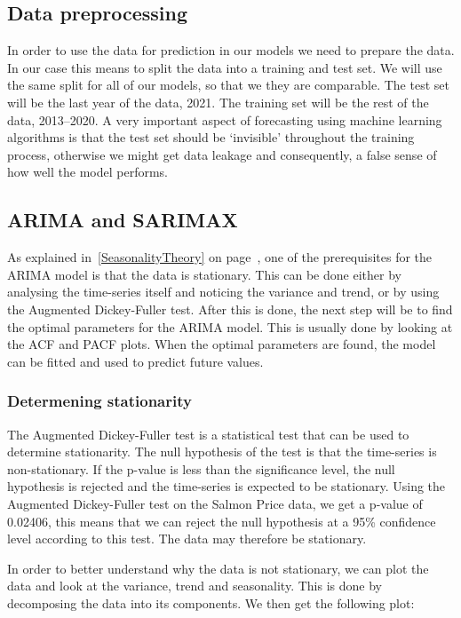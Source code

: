 \subsection{Data preprocessing}
In order to use the data for prediction in our models we need to prepare the data. In our case this means to split the data into a training and test set. We will use the same split for all of our models, so that we they are comparable. The test set will be the last year of the data, 2021. The training set will be the rest of the data, 2013--2020. A very important aspect of forecasting using machine learning algorithms is that the test set should be `invisible' throughout the training process, otherwise we might get data leakage and consequently, a false sense of how well the model performs.~\parencite{brownlee_2016}
\subsection{ARIMA and SARIMAX}\label{ARIMA and SARIMAX Methodology}

As explained in~\ref{SeasonalityTheory} on page~\pageref{SeasonalityTheory}, one of the prerequisites for the ARIMA model is that the data is stationary. This can be done either by analysing the time-series itself and noticing the variance and trend, or by using the Augmented Dickey-Fuller test. 
After this is done, the next step will be to find the optimal parameters for the ARIMA model. This is usually done by looking at the ACF and PACF plots. 
When the optimal parameters are found, the model can be fitted and used to predict future values. \parencite{hyndman_athanasopoulos_2021}

\subsubsection{Determening stationarity}\label{DeterminingStationarity}
The Augmented Dickey-Fuller test is a statistical test that can be used to determine stationarity. The null hypothesis of the test is that the time-series is non-stationary. If the p-value is less than the significance level, the null hypothesis is rejected and the time-series is expected to be stationary.
Using the Augmented Dickey-Fuller test on the Salmon Price data, we get a p-value of 0.02406, this means that we can reject the null hypothesis at a 95\% confidence level according to this test. The data may therefore be stationary.~\parencite{Dickey_Fuller1979}

In order to better understand why the data is not stationary, we can plot the data and look at the variance, trend and seasonality. This is done by decomposing the data into its components. We then get the following plot: 

